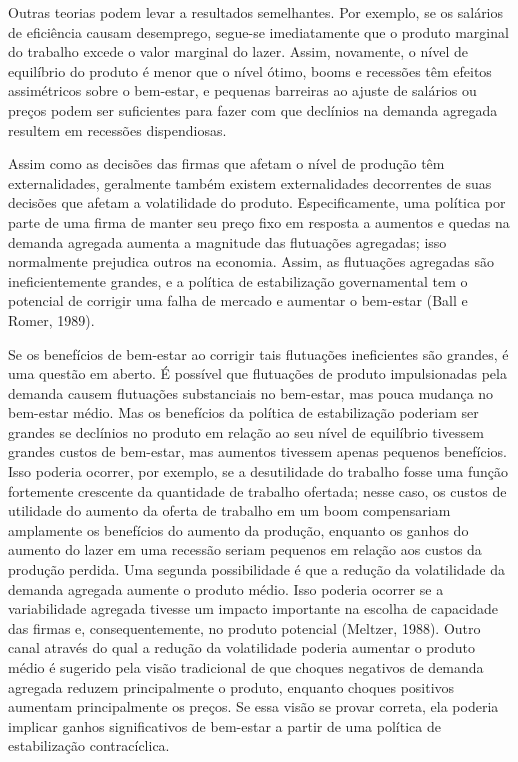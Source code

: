 \documentclass[12pt]{article}
\begin{document}
{Outras teorias podem levar a resultados semelhantes. Por exemplo, se os salários de eficiência causam desemprego, segue-se imediatamente que o produto marginal do trabalho excede o valor marginal do lazer. Assim, novamente, o nível de equilíbrio do produto é menor que o nível ótimo, booms e recessões têm efeitos assimétricos sobre o bem-estar, e pequenas barreiras ao ajuste de salários ou preços podem ser suficientes para fazer com que declínios na demanda agregada resultem em recessões dispendiosas.

Assim como as decisões das firmas que afetam o nível de produção têm externalidades, geralmente também existem externalidades decorrentes de suas decisões que afetam a volatilidade do produto. Especificamente, uma política por parte de uma firma de manter seu preço fixo em resposta a aumentos e quedas na demanda agregada aumenta a magnitude das flutuações agregadas; isso normalmente prejudica outros na economia. Assim, as flutuações agregadas são ineficientemente grandes, e a política de estabilização governamental tem o potencial de corrigir uma falha de mercado e aumentar o bem-estar (Ball e Romer, 1989).

Se os benefícios de bem-estar ao corrigir tais flutuações ineficientes são grandes, é uma questão em aberto. É possível que flutuações de produto impulsionadas pela demanda causem flutuações substanciais no bem-estar, mas pouca mudança no bem-estar médio. Mas os benefícios da política de estabilização poderiam ser grandes se declínios no produto em relação ao seu nível de equilíbrio tivessem grandes custos de bem-estar, mas aumentos tivessem apenas pequenos benefícios. Isso poderia ocorrer, por exemplo, se a desutilidade do trabalho fosse uma função fortemente crescente da quantidade de trabalho ofertada; nesse caso, os custos de utilidade do aumento da oferta de trabalho em um boom compensariam amplamente os benefícios do aumento da produção, enquanto os ganhos do aumento do lazer em uma recessão seriam pequenos em relação aos custos da produção perdida. Uma segunda possibilidade é que a redução da volatilidade da demanda agregada aumente o produto médio. Isso poderia ocorrer se a variabilidade agregada tivesse um impacto importante na escolha de capacidade das firmas e, consequentemente, no produto potencial (Meltzer, 1988). Outro canal através do qual a redução da volatilidade poderia aumentar o produto médio é sugerido pela visão tradicional de que choques negativos de demanda agregada reduzem principalmente o produto, enquanto choques positivos aumentam principalmente os preços. Se essa visão se provar correta, ela poderia implicar ganhos significativos de bem-estar a partir de uma política de estabilização contracíclica.

}
\end{document}
